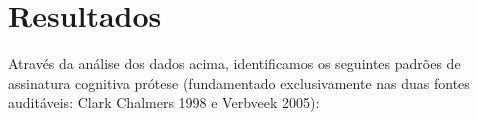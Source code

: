 \documentclass[12pt,a4paper]{article}
\begin{document}
\section{Resultados}

Através da análise dos dados acima, identificamos os seguintes padrões de assinatura cognitiva prótese (fundamentado exclusivamente nas duas fontes auditáveis: Clark Chalmers 1998 e Verbveek 2005):







\end{document}
